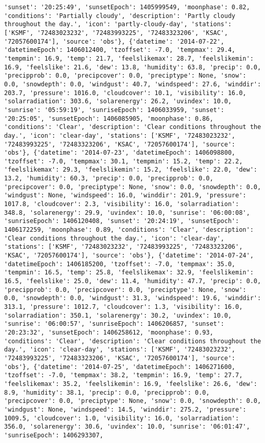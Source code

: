 \documentclass[
  letterpaper,
  DIV=11,
  numbers=noendperiod]{scrartcl}
\begin{document}
\begin{verbatim}
'sunset': '20:25:49', 'sunsetEpoch': 1405999549, 'moonphase': 0.82, 'conditions': 'Partially cloudy', 'description': 'Partly cloudy throughout the day.', 'icon': 'partly-cloudy-day', 'stations': ['KSMF', '72483023232', '72483993225', '72483323206', 'KSAC', '72057600174'], 'source': 'obs'}, {'datetime': '2014-07-22', 'datetimeEpoch': 1406012400, 'tzoffset': -7.0, 'tempmax': 29.4, 'tempmin': 16.9, 'temp': 21.7, 'feelslikemax': 28.7, 'feelslikemin': 16.9, 'feelslike': 21.6, 'dew': 13.8, 'humidity': 63.8, 'precip': 0.0, 'precipprob': 0.0, 'precipcover': 0.0, 'preciptype': None, 'snow': 0.0, 'snowdepth': 0.0, 'windgust': 40.7, 'windspeed': 27.6, 'winddir': 203.7, 'pressure': 1016.0, 'cloudcover': 10.1, 'visibility': 16.0, 'solarradiation': 303.6, 'solarenergy': 26.2, 'uvindex': 10.0, 'sunrise': '05:59:19', 'sunriseEpoch': 1406033959, 'sunset': '20:25:05', 'sunsetEpoch': 1406085905, 'moonphase': 0.86, 'conditions': 'Clear', 'description': 'Clear conditions throughout the day.', 'icon': 'clear-day', 'stations': ['KSMF', '72483023232', '72483993225', '72483323206', 'KSAC', '72057600174'], 'source': 'obs'}, {'datetime': '2014-07-23', 'datetimeEpoch': 1406098800, 'tzoffset': -7.0, 'tempmax': 30.1, 'tempmin': 15.2, 'temp': 22.2, 'feelslikemax': 29.3, 'feelslikemin': 15.2, 'feelslike': 22.0, 'dew': 13.2, 'humidity': 60.3, 'precip': 0.0, 'precipprob': 0.0, 'precipcover': 0.0, 'preciptype': None, 'snow': 0.0, 'snowdepth': 0.0, 'windgust': None, 'windspeed': 16.0, 'winddir': 201.9, 'pressure': 1017.8, 'cloudcover': 2.3, 'visibility': 16.0, 'solarradiation': 348.8, 'solarenergy': 29.9, 'uvindex': 10.0, 'sunrise': '06:00:08', 'sunriseEpoch': 1406120408, 'sunset': '20:24:19', 'sunsetEpoch': 1406172259, 'moonphase': 0.89, 'conditions': 'Clear', 'description': 'Clear conditions throughout the day.', 'icon': 'clear-day', 'stations': ['KSMF', '72483023232', '72483993225', '72483323206', 'KSAC', '72057600174'], 'source': 'obs'}, {'datetime': '2014-07-24', 'datetimeEpoch': 1406185200, 'tzoffset': -7.0, 'tempmax': 35.0, 'tempmin': 16.5, 'temp': 25.8, 'feelslikemax': 32.9, 'feelslikemin': 16.5, 'feelslike': 25.0, 'dew': 11.4, 'humidity': 47.7, 'precip': 0.0, 'precipprob': 0.0, 'precipcover': 0.0, 'preciptype': None, 'snow': 0.0, 'snowdepth': 0.0, 'windgust': 31.3, 'windspeed': 19.6, 'winddir': 313.1, 'pressure': 1012.7, 'cloudcover': 1.3, 'visibility': 16.0, 'solarradiation': 350.1, 'solarenergy': 30.2, 'uvindex': 10.0, 'sunrise': '06:00:57', 'sunriseEpoch': 1406206857, 'sunset': '20:23:32', 'sunsetEpoch': 1406258612, 'moonphase': 0.93, 'conditions': 'Clear', 'description': 'Clear conditions throughout the day.', 'icon': 'clear-day', 'stations': ['KSMF', '72483023232', '72483993225', '72483323206', 'KSAC', '72057600174'], 'source': 'obs'}, {'datetime': '2014-07-25', 'datetimeEpoch': 1406271600, 'tzoffset': -7.0, 'tempmax': 38.2, 'tempmin': 16.9, 'temp': 27.7, 'feelslikemax': 35.2, 'feelslikemin': 16.9, 'feelslike': 26.6, 'dew': 8.9, 'humidity': 38.1, 'precip': 0.0, 'precipprob': 0.0, 'precipcover': 0.0, 'preciptype': None, 'snow': 0.0, 'snowdepth': 0.0, 'windgust': None, 'windspeed': 14.5, 'winddir': 275.2, 'pressure': 1009.5, 'cloudcover': 1.0, 'visibility': 16.0, 'solarradiation': 356.0, 'solarenergy': 30.6, 'uvindex': 10.0, 'sunrise': '06:01:47', 'sunriseEpoch': 1406293307, 
\end{verbatim}
\end{document}
